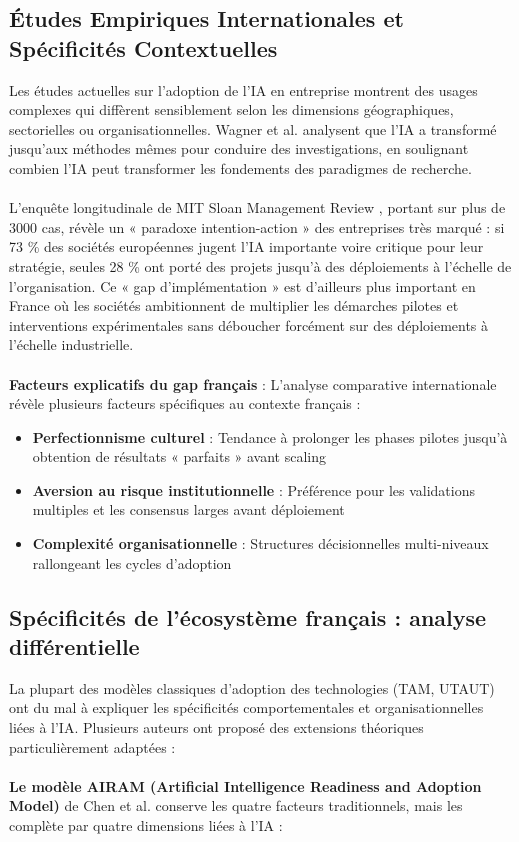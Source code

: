 \subsection{Études Empiriques Internationales et Spécificités Contextuelles}

Les études actuelles sur l’adoption de l’IA en entreprise montrent des usages complexes qui diffèrent sensiblement selon les dimensions géographiques, sectorielles ou organisationnelles. Wagner et al. \cite{wagner2022artificial} analysent que l’IA a transformé jusqu’aux méthodes mêmes pour conduire des investigations, en soulignant combien l’IA peut transformer les fondements des paradigmes de recherche.
\\\\
L’enquête longitudinale de MIT Sloan Management Review \cite{ransbotham2023expanding}, portant sur plus de 3000 cas, révèle un « paradoxe intention-action » des entreprises très marqué : si 73 \% des sociétés européennes jugent l’IA importante voire critique pour leur stratégie, seules 28 \% ont porté des projets jusqu’à des déploiements à l’échelle de l’organisation. Ce « gap d’implémentation » est d’ailleurs plus important en France où les sociétés ambitionnent de multiplier les démarches pilotes et interventions expérimentales sans déboucher forcément sur des déploiements à l’échelle industrielle.
\\\\
\textbf{Facteurs explicatifs du gap français} : L'analyse comparative internationale révèle plusieurs facteurs spécifiques au contexte français :
\begin{itemize}
    \item \textbf{Perfectionnisme culturel} : Tendance à prolonger les phases pilotes jusqu'à obtention de résultats « parfaits » avant scaling
    \item \textbf{Aversion au risque institutionnelle} : Préférence pour les validations multiples et les consensus larges avant déploiement
    \item \textbf{Complexité organisationnelle} : Structures décisionnelles multi-niveaux rallongeant les cycles d'adoption
\end{itemize}

\subsection{Spécificités de l'écosystème français : analyse différentielle}

La plupart des modèles classiques d’adoption des technologies (TAM, UTAUT) ont du mal à expliquer les spécificités comportementales et organisationnelles liées à l’IA. Plusieurs auteurs ont proposé des extensions théoriques particulièrement adaptées :
\\\\
\textbf{Le modèle AIRAM (Artificial Intelligence Readiness and Adoption Model)} de Chen et al. conserve les quatre facteurs traditionnels, mais les complète par quatre dimensions liées à l’IA :


